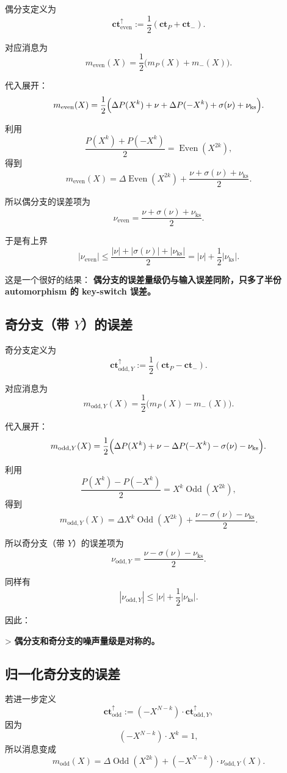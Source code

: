\documentclass{article}
\newcommand{\Pe}{\operatorname{Even}}
\newcommand{\Po}{\operatorname{Odd}}
\newcommand{\ct}{\mathbf{ct}}
\begin{document}
偶分支定义为
\[
\ct_{\mathrm{even}}^{\uparrow}:=\frac12(\ct_P+\ct_{-}).
\]

对应消息为
\[
m_{\mathrm{even}}(X) = \frac12\bigl(m_P(X)+m_{-}(X)\bigr).
\]

代入展开：
\[
m_{\mathrm{even}}(X) = \frac12\Bigl(\Delta P(X^k)+\nu+\Delta P(-X^k)+\sigma(\nu)+\nu_{\mathrm{ks}}\Bigr).
\]

利用
\[
\frac{P(X^k)+P(-X^k)}{2}=\Pe(X^{2k}),
\]
得到
\[
m_{\mathrm{even}}(X) = \Delta \Pe(X^{2k}) + \frac{\nu+\sigma(\nu)+\nu_{\mathrm{ks}}}{2}.
\]

所以偶分支的误差项为
\[
\nu_{\mathrm{even}} = \frac{\nu+\sigma(\nu)+\nu_{\mathrm{ks}}}{2}.
\]

于是有上界
\[
|\nu_{\mathrm{even}}| \le \frac{|\nu|+|\sigma(\nu)|+|\nu_{\mathrm{ks}}|}{2} = |\nu|+\frac12|\nu_{\mathrm{ks}}|.
\]

这是一个很好的结果：
\textbf{偶分支的误差量级仍与输入误差同阶，只多了半份 automorphism 的 key-switch 误差。}

\subsection{奇分支（带 \(Y\)）的误差}

奇分支定义为
\[
\ct_{\mathrm{odd},Y}^{\uparrow}:=\frac12(\ct_P-\ct_{-}).
\]

对应消息为
\[
m_{\mathrm{odd},Y}(X) = \frac12\bigl(m_P(X)-m_{-}(X)\bigr).
\]

代入展开：
\[
m_{\mathrm{odd},Y}(X) = \frac12\Bigl(\Delta P(X^k)+\nu-\Delta P(-X^k)-\sigma(\nu)-\nu_{\mathrm{ks}}\Bigr).
\]

利用
\[
\frac{P(X^k)-P(-X^k)}{2}=X^k\Po(X^{2k}),
\]
得到
\[
m_{\mathrm{odd},Y}(X) = \Delta X^k\Po(X^{2k}) + \frac{\nu-\sigma(\nu)-\nu_{\mathrm{ks}}}{2}.
\]

所以奇分支（带 \(Y\)）的误差项为
\[
\nu_{\mathrm{odd},Y} = \frac{\nu-\sigma(\nu)-\nu_{\mathrm{ks}}}{2}.
\]

同样有
\[
|\nu_{\mathrm{odd},Y}| \le |\nu|+\frac12|\nu_{\mathrm{ks}}|.
\]

因此：

> \textbf{偶分支和奇分支的噪声量级是对称的。}

\subsection{归一化奇分支的误差}

若进一步定义
\[
\ct_{\mathrm{odd}}^{\uparrow}:=(-X^{N-k})\cdot \ct_{\mathrm{odd},Y}^{\uparrow},
\]
因为
\[
(-X^{N-k})\cdot X^k = 1,
\]
所以消息变成
\[
m_{\mathrm{odd}}(X) = \Delta \Po(X^{2k}) + (-X^{N-k})\cdot \nu_{\mathrm{odd},Y}(X).
\]
\end{document}
